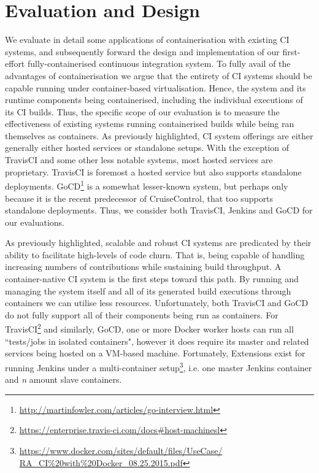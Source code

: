 \documentclass[journal]{IEEEtran}
\begin{document}
\section{Evaluation and Design}
We evaluate in detail some applications of containerisation with existing CI systems, and subsequently forward the design
and implementation of our first-effort fully-containerised continuous integration system. To fully avail of the advantages of containerisation we argue that the entirety of CI systems should be capable running under container-based virtualisation. Hence, the system and its runtime components being containerised, including the individual executions of its CI builds. Thus, the specific scope of our evaluation is to measure the effectiveness of existing systems running containerised builds while being ran themselves as containers. As previously highlighted, CI system
offerings are either generally either hosted services or standalone setups. With the exception of TravisCI and some other 
less notable systems, most hosted services are proprietary. TravisCI is foremost a hosted service but also supports standalone deployments.
GoCD\footnote{\href{http://martinfowler.com/articles/go-interview.html}{http://martinfowler.com/articles/go-interview.html}} is a somewhat lesser-known system, but perhaps only because it is the recent predecessor of CruiseControl, that too supports standalone deployments.
Thus, we consider both TravisCI, Jenkins and GoCD for our evaluations.
\par
As previously highlighted, scalable and robust CI systems are 
predicated by their ability to facilitate high-levels of code churn. That is,
being capable of handling increasing numbers of contributions while 
sustaining build throughput. A container-native CI system is the first 
steps toward this path. By running and managing the system itself and all of its generated 
build executions through containers we can utilise less resources. 
Unfortunately, both TravisCI and GoCD do not fully support all of their components 
being run as containers. For TravisCI\footnote{\href{https://enterprise.travis-ci.com/docs#host-machines}{https://enterprise.travis-ci.com/docs#host-machinesl}} 
and similarly, GoCD, one or more Docker worker hosts can run all ``tests/jobs in isolated containers", 
however it does require its master and related services being hosted on a VM-based machine.
Fortunately, Extensions exist for running Jenkins under a multi-container setup\footnote{\href{https://www.docker.com/sites/default/files/UseCase/RA_CI\%20with\%20Docker_08.25.2015.pdf}{https://www.docker.com/sites/default/files/UseCase/\\RA_CI\%20with\%20Docker_08.25.2015.pdf}}, i.e.
one master Jenkins container and \textit{n} amount slave containers.
\end{document}
